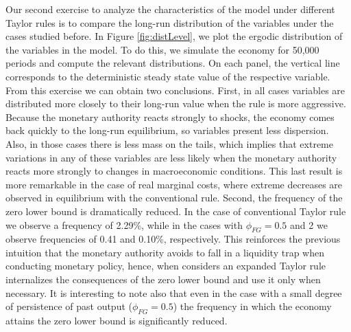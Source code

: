 \documentclass[11pt]{article}
\numberwithin{equation}{section}
\begin{document}
Our second exercise to analyze the characteristics of the model under different Taylor rules is to compare the long-run distribution of the variables under the cases studied before. In Figure \ref{fig:distLevel}, we plot the ergodic distribution of the variables in the model. To do this, we simulate the economy for 50,000 periods and compute the relevant distributions. On each panel, the vertical line corresponds to the deterministic steady state value of the respective variable. From this exercise we can obtain two conclusions. First, in all cases variables are distributed more closely to their long-run value when the rule is more aggressive. Because the monetary authority reacts strongly to shocks, the economy comes back quickly to the long-run equilibrium, so variables present less dispersion. Also, in those cases there is less mass on the tails, which implies that extreme variations in any of these variables are less likely when the monetary authority reacts more strongly to changes in macroeconomic conditions. This last result is more remarkable in the case of real marginal costs, where extreme decreases are observed in equilibrium with the conventional rule. Second, the frequency of the zero lower bound is dramatically reduced. In the case of conventional Taylor rule we observe a frequency of 2.29\%, while in the cases with $\phi_{FG}=0.5$ and 2 we observe frequencies of 0.41 and 0.10\%, respectively. This reinforces the previous intuition that the monetary authority avoids to fall in a liquidity trap when conducting monetary policy, hence, when considers an expanded Taylor rule internalizes the consequences of the zero lower bound and use it only when necessary. It is interesting to note also that even in the case with a small degree of persistence of past output ($\phi_{FG}=0.5$) the frequency in which the economy attains the zero lower bound is significantly reduced.
\end{document}
